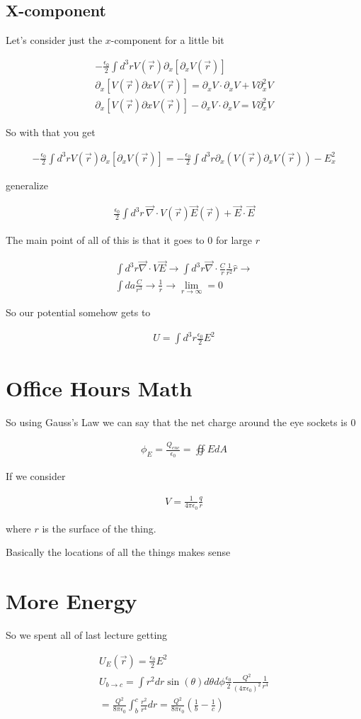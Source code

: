 \documentclass[fleqn]{report}
\newcommand{\del}{\partial}
\newcommand{\equations} [1] {
\begin{gather*}
#1
\end{gather*}
}
\begin{document}
\subsection{X-component}
Let's consider just the $x$-component for a little bit 

\equations{
    - \frac{\epsilon_0}{2} 
    \int d^3 r V(\vec r) \del_x \left[ \del_x V(\vec r) \right]
    \\
    \del_x \left[ V(\vec r) \del x V(\vec r) \right]
    =
    \del_x V \cdot \del_x V + V \del_x^2 V 
    \\
    \del_x \left[ V(\vec r) \del x V(\vec r) \right]
    - \del_x V \cdot \del_x V 
    =
    V \del_x^2 V 
}
So with that you get 
\equations{
    - \frac{\epsilon_0}{2} 
    \int d^3 r V(\vec r) \del_x \left[ \del_x V(\vec r)\right]
    =
    - \frac{\epsilon_0}{2} 
    \int d^3 r \del_x \left( V(\vec r) \del_x V (\vec r)\right)
    - E_x^2
}
generalize 
\equations{
    \frac{\epsilon_0}{2} 
    \int d^3 r \, \vec \nabla \cdot V(\vec r) \vec E(\vec r) + 
    \vec E \cdot \vec E 
}

The main point of all of this is that it goes to $0$ for large $r$ 
\equations{
    \int d^3 r \vec \nabla \cdot V \vec E 
    \rightarrow 
    \int d^3 r \vec \nabla \cdot \frac{C}{r} \frac{1}{r^2} \hat r 
    \rightarrow 
    \\
    \int da \frac{C}{r^3}
    \rightarrow 
    \frac{1}{r}
    \rightarrow \lim_{r \to \infty} = 0
}

So our potential somehow gets to 
\equations{
    U  =
    \int d^3 r \frac{\epsilon_0}{2} E^2 
}

\section{Office Hours Math}
So using Gauss's Law we can say that the net charge around the eye 
sockets is 0

\equations{
    \phi_E = 
    \frac{Q_{enc}}{\epsilon_0}
    =
    \oiint E dA
}

If we consider 
\equations{
    V = \frac{1}{4 \pi \epsilon_0} \frac{q}{r}
}
where $r$ is the surface of the thing. 

Basically the locations of all the things makes sense 

\section{More Energy}
So we spent all of last lecture getting 
\equations{
    U_E(\vec r) = \frac{\epsilon_0}{2} E^2
    \\
    U_{b \to c}
    =
    \int r^2 dr \sin(\theta) d \theta d \phi \frac{\epsilon_0}{2} 
    \frac{Q^2}{(4 \pi \epsilon_0)^2} \frac{1}{r^4}
    \\
    =
    \frac{Q^2}{8 \pi \epsilon_0} \int^c_b \frac{r^2}{r^4} dr 
    =
    \frac{Q^2}{8 \pi \epsilon_0} 
    \left(
        \frac{1}{b}
        -
        \frac{1}{c}
    \right)
}
\end{document}
